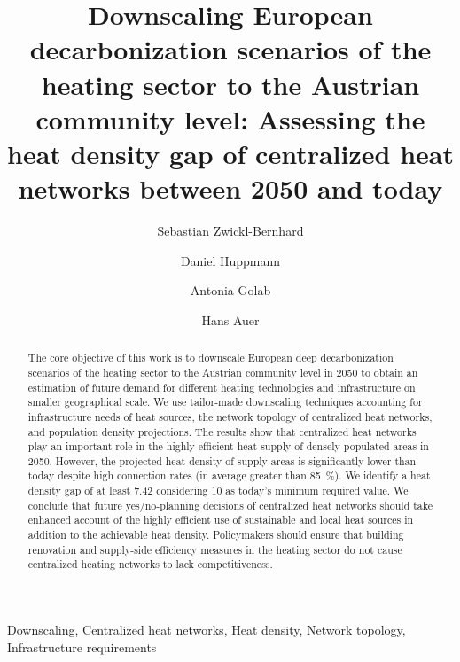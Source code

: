 \documentclass[review]{elsarticle}
\begin{document}
\begin{frontmatter}

\title{Downscaling European decarbonization scenarios of the heating sector to the Austrian community level: Assessing the heat density gap of centralized heat networks between 2050 and today}
\author[1,2]{Sebastian Zwickl-Bernhard}
\author[2]{Daniel Huppmann}
\author[1]{Antonia Golab}
\author[1]{Hans Auer}
\address[1]{Energy Economics Group (EEG), Technische Universität Wien, Gusshausstrasse 25-29/E370-3, 1040 Wien, Austria}
\address[2]{Energy, Climate and Environment (ECE) Program,  International Institute for Applied Systems Analysis (IIASA), Laxenburg, Austria}

\begin{abstract}
	The core objective of this work is to downscale European deep decarbonization scenarios of the heating sector to the Austrian community level in 2050 to obtain an estimation of future demand for different heating technologies and infrastructure on smaller geographical scale. We use tailor-made downscaling techniques accounting for infrastructure needs of heat sources, the network topology of centralized heat networks, and population density projections. The results show that centralized heat networks play an important role in the highly efficient heat supply of densely populated areas in 2050. However, the projected heat density of supply areas is significantly lower than today despite high connection rates (in average greater than \SI{85}{\%}). We identify a heat density gap of at least \SI{7.42}{} considering \SI{10}{} as today's minimum required value. We conclude that future yes/no-planning decisions of centralized heat networks should take enhanced account of the highly efficient use of sustainable and local heat sources in addition to the achievable heat density. Policymakers should ensure that building renovation and supply-side efficiency measures in the heating sector do not cause centralized heating networks to lack competitiveness. 
\end{abstract}

\begin{keyword}
	Downscaling, Centralized heat networks, Heat density, Network topology, Infrastructure requirements
\end{keyword}
\end{frontmatter}

\linenumbers

\newpage

\newpage

\newpage

\end{document}
